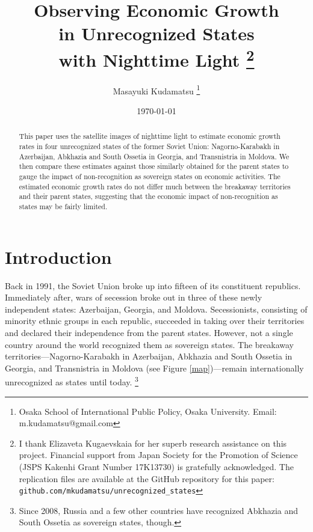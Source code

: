 \documentclass[12pt,a4paper]{article}%
\begin{document}
\cprotect\title{
	Observing Economic Growth \\in Unrecognized States \\with Nighttime Light 
	\cprotect\thanks{%
		I thank Elizaveta Kugaevskaia for her superb research assistance on this project. 
		Financial support from Japan Society for the Promotion of Science (JSPS Kakenhi Grant Number 17K13730) is gratefully acknowledged. 
		The replication files are available at the GitHub repository for this paper: \verb!github.com/mkudamatsu/unrecognized_states!
		} 
	}
\author{Masayuki Kudamatsu \thanks{Osaka School of International Public Policy, Osaka University. Email: m.kudamatsu@gmail.com}}
\date{\today}
\maketitle

\begin{abstract}
This paper uses the satellite images of nighttime light to estimate economic growth rates in four unrecognized states of the former Soviet Union: Nagorno-Karabakh in Azerbaijan, Abkhazia and South Ossetia in Georgia, and Transnistria in Moldova. We then compare these estimates against those similarly obtained for the parent states to gauge the impact of non-recognition as sovereign states on economic activities. The estimated economic growth rates do not differ much between the breakaway territories and their parent states, suggesting that the economic impact of non-recognition as states may be fairly limited.
\end{abstract}

\newpage

\section{Introduction}
Back in 1991, the Soviet Union broke up into fifteen of its constituent republics. 
Immediately after, wars of secession broke out in three of these newly independent states: Azerbaijan, Georgia, and Moldova.
Secessionists, consisting of minority ethnic groups in each republic, succeeded in taking over their territories and declared their independence from the parent states. 
However, not a single country around the world recognized them as sovereign states. 
The breakaway territories---Nagorno-Karabakh in Azerbaijan, Abkhazia and South Ossetia in Georgia, and Transnistria in Moldova (see Figure \ref{map})---remain internationally unrecognized as states until today.%
\footnote{%
	Since 2008, Russia and a few other countries have recognized Abkhazia and South Ossetia as sovereign states, though.
} 
\end{document}
